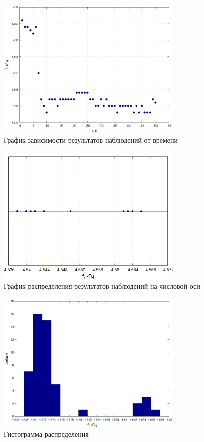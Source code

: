 \begin{figure}[ht!]
\centering
\includegraphics[width=0.8\textwidth]{Plot1.png}
\caption{График зависимости результатов наблюдений от времени}
\label{fig:plot1}
\end{figure}

\begin{figure}[ht!]
\centering
\includegraphics[width=0.8\textwidth]{Plot2.png}
\caption{График распределения результатов наблюдений на числовой оси}
\label{fig:plot2}
\end{figure}

\begin{figure}[ht!]
\centering
\includegraphics[width=0.8\textwidth]{Plot3.png}
\caption{Гистограмма распределения}
\label{fig:plot3}
\end{figure}

